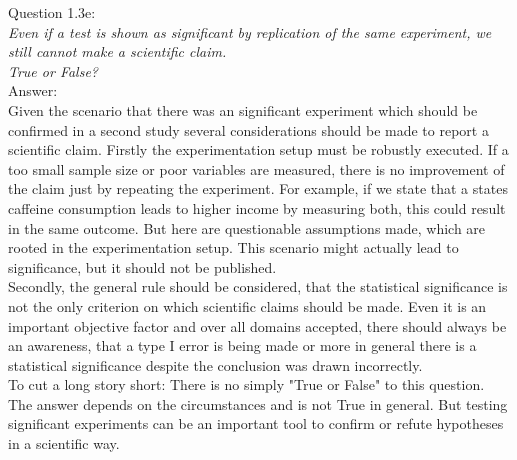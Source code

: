 
Question 1.3e:\\	
\textsl{Even if a test is shown as significant by replication of the same experiment, we still cannot make a scientific claim.}\\
	
\textsl{True or False? }\\

Answer:\\
Given the scenario that there was an significant experiment which should be confirmed in a second study several considerations should be made to report a scientific claim. Firstly the experimentation setup must be robustly executed. If a too small sample size or poor variables are measured, there is no improvement of the claim just by repeating the experiment. For example, if we state that a states caffeine consumption leads to higher income by measuring both, this could result in the same outcome. But here are questionable assumptions made, which are rooted in the experimentation setup. This scenario might actually lead to significance, but it should not be published.\\

Secondly, the general rule should be considered, that the statistical significance is not the only criterion on which scientific claims should be made. Even it is an important objective factor and over all domains accepted, there should always be an awareness, that a type I error is being made or more in general there is a statistical significance despite the conclusion was drawn incorrectly.\\

To cut a long story short: There is no simply "True or False" to this question. The answer depends on the circumstances and is not True in general. But testing significant experiments can be an important tool to confirm or refute hypotheses in a scientific way.\\






